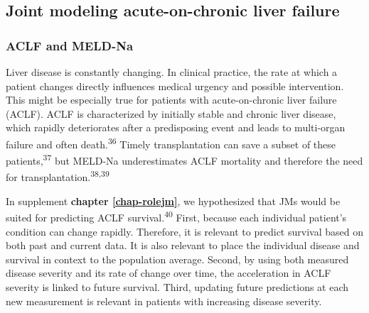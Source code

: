 \documentclass[11pt,english,]{book} %
\begin{document}
\hypertarget{joint-modeling-acute-on-chronic-liver-failure}{%
\subsection*{Joint modeling acute-on-chronic liver failure}\label{joint-modeling-acute-on-chronic-liver-failure}}

\hypertarget{aclf-and-meld-na}{%
\subsubsection*{ACLF and MELD-Na}\label{aclf-and-meld-na}}

Liver disease is constantly changing. In clinical practice, the rate at which a patient changes directly influences medical urgency and possible intervention. This might be especially true for patients with acute-on-chronic liver failure (ACLF). ACLF is characterized by initially stable and chronic liver disease, which rapidly deteriorates after a predisposing event and leads to multi-organ failure and often death.\textsuperscript{36} Timely transplantation can save a subset of these patients,\textsuperscript{37} but MELD-Na underestimates ACLF mortality and therefore the need for transplantation.\textsuperscript{38,39}

In supplement \textbf{chapter \ref{chap-rolejm}}, we hypothesized that JMs would be suited for predicting ACLF survival.\textsuperscript{40} First, because each individual patient's condition can change rapidly. Therefore, it is relevant to predict survival based on both past and current data. It is also relevant to place the individual disease and survival in context to the population average. Second, by using both measured disease severity and its rate of change over time, the acceleration in ACLF severity is linked to future survival. Third, updating future predictions at each new measurement is relevant in patients with increasing disease severity.
\end{document}
